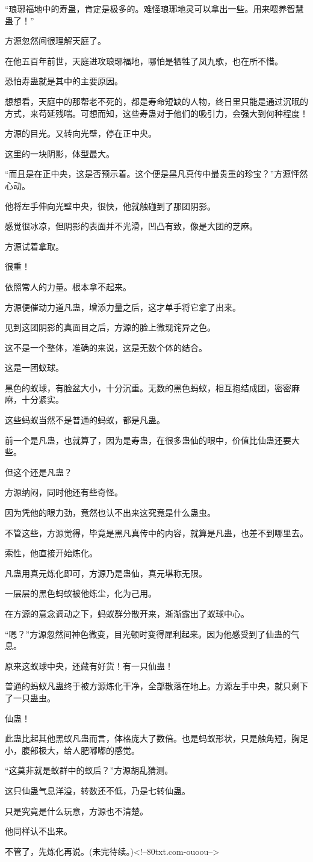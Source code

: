 \begin{this_body}
“琅琊福地中的寿蛊，肯定是极多的。难怪琅琊地灵可以拿出一些。用来喂养智慧蛊了！”

方源忽然间很理解天庭了。

在他五百年前世，天庭进攻琅琊福地，哪怕是牺牲了凤九歌，也在所不惜。

恐怕寿蛊就是其中的主要原因。

想想看，天庭中的那帮老不死的，都是寿命短缺的人物，终日里只能是通过沉眠的方式，来苟延残喘。可想而知，这些寿蛊对于他们的吸引力，会强大到何种程度！

方源的目光。又转向光壁，停在正中央。

这里的一块阴影，体型最大。

“而且是在正中央，这是否预示着。这个便是黑凡真传中最贵重的珍宝？”方源怦然心动。

他将左手伸向光壁中央，很快，他就触碰到了那团阴影。

感觉很冰凉，但阴影的表面并不光滑，凹凸有致，像是大团的芝麻。

方源试着拿取。

很重！

依照常人的力量。根本拿不起来。

方源便催动力道凡蛊，增添力量之后，这才单手将它拿了出来。

见到这团阴影的真面目之后，方源的脸上微现诧异之色。

这不是一个整体，准确的来说，这是无数个体的结合。

这是一团蚁球。

黑色的蚁球，有脸盆大小，十分沉重。无数的黑色蚂蚁，相互抱结成团，密密麻麻，十分紧实。

这些蚂蚁当然不是普通的蚂蚁，都是凡蛊。

前一个是凡蛊，也就算了，因为是寿蛊，在很多蛊仙的眼中，价值比仙蛊还要大些。

但这个还是凡蛊？

方源纳闷，同时他还有些奇怪。

因为凭他的眼力劲，竟然也认不出来这究竟是什么蛊虫。

不管这些，方源觉得，毕竟是黑凡真传中的内容，就算是凡蛊，也差不到哪里去。

索性，他直接开始炼化。

凡蛊用真元炼化即可，方源乃是蛊仙，真元堪称无限。

一层层的黑色蚂蚁被他炼尘，化为己用。

在方源的意念调动之下，蚂蚁群分散开来，渐渐露出了蚁球中心。

“嗯？”方源忽然间神色微变，目光顿时变得犀利起来。因为他感受到了仙蛊的气息。

原来这蚁球中央，还藏有好货！有一只仙蛊！

普通的蚂蚁凡蛊终于被方源炼化干净，全部散落在地上。方源左手中央，就只剩下了一只蛊虫。

仙蛊！

此蛊比起其他黑蚁凡蛊而言，体格庞大了数倍。也是蚂蚁形状，只是触角短，胸足小，腹部极大，给人肥嘟嘟的感觉。

“这莫非就是蚁群中的蚁后？”方源胡乱猜测。

这只仙蛊气息洋溢，转数还不低，乃是七转仙蛊。

只是究竟是什么玩意，方源也不清楚。

他同样认不出来。

不管了，先炼化再说。(未完待续。)<!--80txt.com-ouoou-->

\end{this_body}

